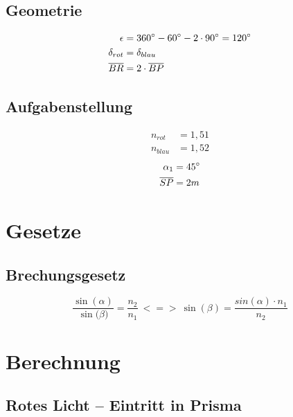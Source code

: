 \subsection{Geometrie}

\begin{multicols}{2}
	\noindent
	\begin{align*}
		\epsilon      &= 360 \degree - 60 \degree - 2 \cdot 90 \degree = 120 \degree \\
		\delta_{rot}  &= \delta_{blau} \\
		\overline{BR} &= 2 \cdot \overline{BP}
	\end{align*}
\end{multicols}

\subsection{Aufgabenstellung}

\begin{multicols}{3}
	\noindent
	\begin{align*}
		n_{rot}       &= 1,51 \\
		n_{blau}      &= 1,52
	\end{align*}
	\begin{align*}
		\alpha_{1}    &= 45 \degree \\
		\overline{SP} &= 2m
	\end{align*}
\end{multicols}


\section{Gesetze}

\subsection{Brechungsgesetz}

\begin{equation}
\frac{\sin{(\alpha)}}{\sin{(\beta})} = \frac{n_{2}}{n_{1}} \ <=> \ 
\sin{(\beta)} = \frac{sin{(\alpha)} \cdot n_{1}}{n_{2}} \label{eq:brechung}
\end{equation}


\section{Berechnung}



\subsection{Rotes Licht -- Eintritt in Prisma}


